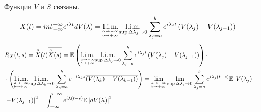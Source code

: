 Функции $V$ и $S$ связаны.
\begin{align*}
  & X(t) = int_{-\infty}^{+\infty}e^{i\lambda t} dV(\lambda) = \underset{^{a \to -\infty}_{b \to +\infty}}{\text{l}.\text{i}.\text{m}.} \underset{\sup \Delta \lambda_j \to 0}{\text{l}.\text{i}.\text{m}.}\sum_{\lambda_j=a}^be^{i\lambda_jt}\left( V(\lambda_j) - V(\lambda_{j-1}) \right)
\end{align*}
\begin{align*}
  & R_X(t,s) = \overset{\circ}{X}(t)\overline{\overset{\circ}{X}(s)} = \mathbb{E} \left( \underset{^{a \to -\infty}_{b \to +\infty}}{\text{l}.\text{i}.\text{m}.}\underset{\sup \Delta \lambda_j \to 0}{\text{l}.\text{i}.\text{m}.} \sum_{\lambda_j=a}^be^{i\lambda_jt}\left( V(\lambda_j) - V(\lambda_{j-1}) \right)\right)\cdot \\
  & \cdot \left( \underset{^{a \to -\infty}_{b \to +\infty}}{\text{l}.\text{i}.\text{m}.}\underset{\sup \Delta \lambda_k \to 0}{\text{l}.\text{i}.\text{m}.} \sum_{\lambda_k=a}^be^{-i\lambda_ks}\overline{\left( V(\lambda_k) - V(\lambda_{k-1}) \right)}\right) = \lim_{^{a \to -\infty}_{b \to +\infty}}\lim_{\sup \Delta \lambda_j \to 0} \sum_{\lambda_j=a}^be^{i\lambda_j(t-s)}\mathbb{E} \left| V(\lambda_j) - \right. \\
  & \left. - V(\lambda_{j-1}) \right|^2 = \int_{-\infty}^{+\infty} e^{i\lambda(t-s)}\mathbb{E} \left| dV(\lambda) \right|^2
\end{align*}

